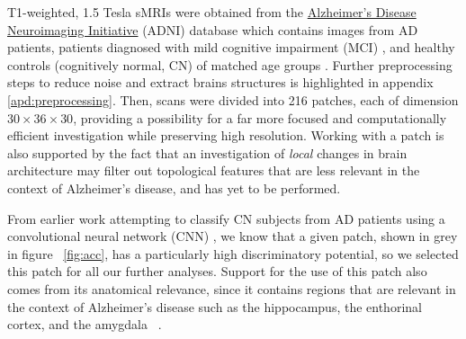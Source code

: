 \documentclass{article}
\begin{document}
T1-weighted, 1.5 Tesla sMRIs were obtained from the \href{adni.loni.usc.edu}{Alzheimer's Disease Neuroimaging Initiative} (ADNI) database which contains images from AD patients, patients diagnosed with mild cognitive impairment (MCI) \citep{gauthier2006mild}, and healthy controls (cognitively normal, CN) of matched age groups \citep{jack2008alzheimer}. Further preprocessing steps to reduce noise and extract brains structures is highlighted in appendix \ref{apd:preprocessing}. Then, scans were divided into 216 patches, each of dimension $30\times36\times30$, providing a possibility for a far more focused and computationally efficient investigation while preserving high resolution. Working with a patch is also supported by the fact that an investigation of \emph{local} changes in brain architecture may filter out topological features that are less relevant in the context of Alzheimer's disease, and has yet to be performed.

From earlier work attempting to classify CN subjects from AD patients using a convolutional neural network (CNN) \citep{bruningk2020image}, we know that a given patch, shown in grey in figure ~\ref{fig:acc}, has a particularly high discriminatory potential, so we selected this patch for all our further analyses. Support for the use of this patch also comes from its anatomical relevance, since it contains regions that are relevant in the context of Alzheimer's disease such as the hippocampus, the enthorinal cortex, and the amygdala ~\citep{goedert2006century}.
\end{document}
